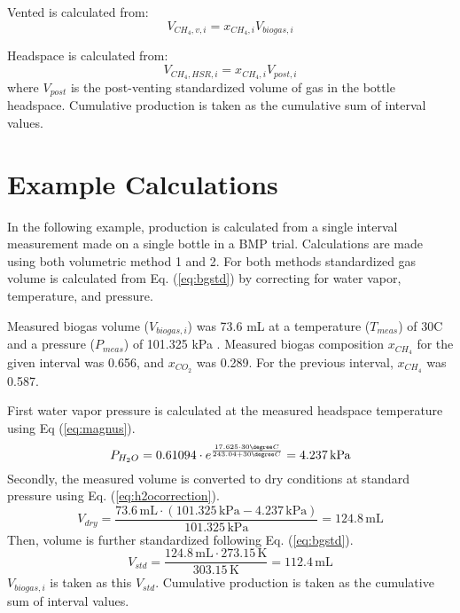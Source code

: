\documentclass[]{article}
\newcommand{\unit}[1]{\ensuremath{\, \mathrm{#1}}}
\begin{document}
Vented  is calculated from:
\begin{equation}
  V_{CH_4, v, i} = x_{CH_4, i} V_{biogas, i}
\end{equation}

Headspace  is calculated from:
\begin{equation}
  V_{CH_4, HSR, i} = x_{CH_4, i} V_{post, i}
\end{equation}
where $V_{post}$ is the post-venting standardized volume of gas in the bottle headspace.
Cumulative production is taken as the cumulative sum of interval values. 

\section{Example Calculations}
In the following example,  production is calculated from a single interval measurement made on a single bottle in a BMP trial. Calculations are made using both volumetric method 1 and 2. 
For both methods standardized gas volume is calculated from Eq. (\ref{eq:bgstd}) by correcting for water vapor, temperature, and pressure.

Measured biogas volume ($V_{biogas,i}$) was 73.6 mL at a temperature ($T_{meas}$) of 30\degree C and a pressure ($P_{meas}$) of 101.325 kPa .
Measured biogas composition $x_{CH_4}$ for the given interval was 0.656, and $x_{CO_2}$ was 0.289. For the previous interval, $x_{CH_4}$ was 0.587.

First water vapor pressure is calculated at the measured headspace temperature using Eq (\ref{eq:magnus}).
\begin{equation*}
   P_{H_2O} = 0.61094 \cdot e^{\frac{17.625 \cdot 30\degree C}{243.04 + 30\degree C}} = 4.237\unit{kPa}
\end{equation*}
Secondly, the measured volume is converted to dry conditions at standard pressure using Eq. (\ref{eq:h2ocorrection}).
\begin{equation*}
   V_{dry} = \frac{73.6\unit{mL} \cdot (101.325\unit{kPa} - 4.237\unit{kPa})}{101.325\unit{kPa}} = 124.8\unit{mL}  
\end{equation*}
Then, volume is further standardized following Eq. (\ref{eq:bgstd}).
\begin{equation*}
    V_{std} = \frac{124.8\unit{mL} \cdot 273.15\unit{K}}{303.15\unit{K}} = 112.4\unit{mL}  
\end{equation*}
$V_{biogas,i}$ is taken as this $V_{std}$. Cumulative production is taken as the cumulative sum of interval values.
\end{document}

